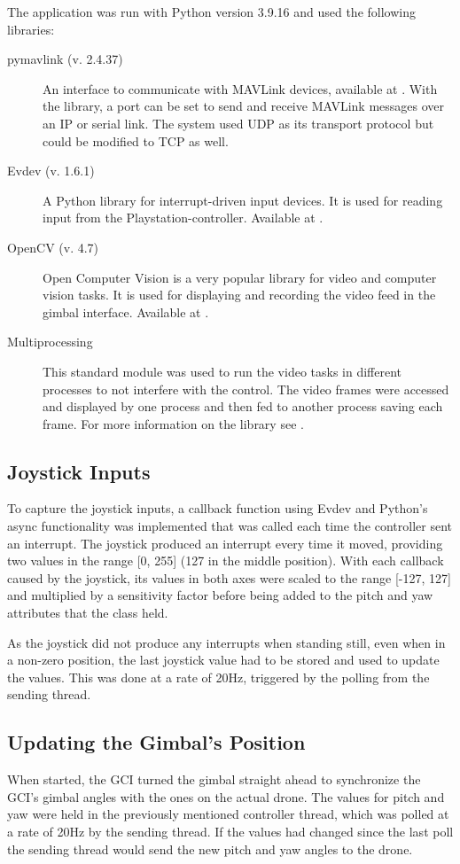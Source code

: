\documentclass[nofilelist]{cslthse-msc}
\begin{document}
The application was run with Python version 3.9.16 and used the following libraries:
\begin{description} 
   \item [pymavlink (v. 2.4.37)]
   An interface to communicate with MAVLink devices, available at \cite{pymavlink}. With the library, a port can be set to send and receive MAVLink messages over an IP or serial link. The system used UDP as its transport protocol but could be modified to TCP as well.
 
   \item [Evdev (v. 1.6.1)]
   A Python library for interrupt-driven input devices. It is used for reading input from the Playstation-controller. Available at \cite{evdev}.

   \item [OpenCV (v. 4.7)] 
   Open Computer Vision is a very popular library for video and computer vision tasks. It is used for displaying and recording the video feed in the gimbal interface. Available at \cite{opencv}.

   \item[Multiprocessing]
   This standard module was used to run the video tasks in different processes to not interfere with the control. The video frames were accessed and displayed by one process and then fed to another process saving each frame. For more information on the library see \cite{multiprocessing}.  
\end{description}

\subsection{Joystick Inputs}
To capture the joystick inputs, a callback function using Evdev and Python's async functionality was implemented that was called each time the controller sent an interrupt. The joystick produced an interrupt every time it moved, providing two values in the range [0, 255] (127 in the middle position). With each callback caused by the joystick, its values in both axes were scaled to the range [-127, 127] and multiplied by a sensitivity factor before being added to the pitch and yaw attributes that the class held. 

As the joystick did not produce any interrupts when standing still, even when in a non-zero position, the last joystick value had to be stored and used to update the values. This was done at a rate of 20Hz, triggered by the polling from the sending thread.

\subsection{Updating the Gimbal's Position}
When started, the GCI turned the gimbal straight ahead to synchronize the GCI's gimbal angles with the ones on the actual drone. The values for pitch and yaw were held in the previously mentioned controller thread, which was polled at a rate of 20Hz by the sending thread. If the values had changed since the last poll the sending thread would send the new pitch and yaw angles to the drone.
\end{document}

